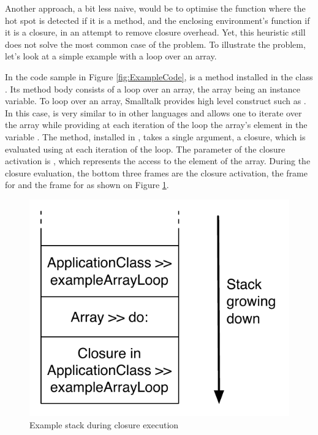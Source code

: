 \documentclass[a4paper,12pt,twoside]{../includes/ThesisStyle}
\begin{document}
Another approach, a bit less naive, would be to optimise the function where the hot spot is detected if it is a method, and the enclosing environment's function if it is a closure, in an attempt to remove closure overhead. Yet, this heuristic still does not solve the most common case of the problem. To illustrate the problem, let's look at a simple example with a loop over an array.

In the code sample in Figure \ref{fig:ExampleCode},  is a method installed in the class . Its method body consists of a loop over an array, the array being an instance variable. To loop over an array, Smalltalk provides high level construct such as . In this case,  is very similar to  in other languages and allows one to iterate over the array while providing at each iteration of the loop the array's element in the variable . The  method, installed in , takes a single argument, a closure, which is evaluated using  at each iteration of the loop. The parameter of the closure activation is , which represents the access to the element  of the array. During the closure evaluation, the bottom three frames are the closure activation, the frame for  and the frame for  as shown on Figure \ref{fig:ExampleLoopStack}.

\begin{figure}[h!]
    \begin{center}
        \includegraphics[width=0.42\linewidth]{ExampleLoopStack}
        \caption{Example stack during closure execution}
        \label{fig:ExampleLoopStack}
    \end{center}
\end{figure}
\end{document}
